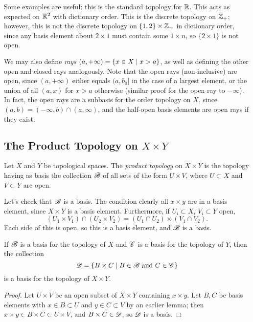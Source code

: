 \documentclass[10pt]{report}
\begin{document}
Some examples are useful: this is the standard topology for $\mathbb{R}$.
This acts as expected on $\mathbb{R}^2$ with dictionary order.
This is the discrete topology on $\mathbb{Z}_+$;
however, this is not the discrete topology on $\left\{ 1,2 \right\} \times \mathbb{Z}_+$ in dictionary order, since any basis element about $2 \times 1$ must contain some $1 \times n$, so $\{2 \times 1\}$ is not open.

We may also define \emph{rays} $(a,+\infty) = \left\{ x \in X \mid x > a \right\}$, as well as defining the other open and closed rays analogously.
Note that the open rays (non-inclusive) are open, since $(a,+\infty)$ either equals $(a,b_0]$ in the case of a largest element, or the union of all $(a,x)$ for $x > a$ otherwise (similar proof for the open ray to $-\infty$).
In fact, the open rays are a subbasis for the order topology on $X$, since $(a,b) = (-\infty,b) \cap (a,\infty)$, and the half-open basis elements are open rays if they exist.

\subsection{The Product Topology on \texorpdfstring{$X \times Y$}{XxY}}
\begin{definition}
  Let $X$ and $Y$ be topological spaces.
  The \emph{product topology} on $X \times Y$ is the topology having as basis the collection $\mathscr{B}$ of all sets of the form $U \times V$, where $U \subset X$ and $V \subset Y$ are open.
\end{definition}

Let's check that $\mathscr{B}$ is a basis.
The condition clearly all $x \times y$ are in a basis element, since $X \times Y$ is a basis element.
Furthermore, if $U_i \subset X$, $V_i \subset Y$ open, 
\[
  (U_1 \times V_1) \cap (U_2 \times V_2)
  = (U_1 \cap U_2) \times (V_1 \cap V_2).
\]
Each side of this is open, so this is a basis element, and $\mathscr{B}$ is a basis.

\begin{theorem}
  If $\mathscr{B}$ is a basis for the topology of $X$ and $\mathscr{C}$ is a basis for the topology of $Y$, then the collection
  \[
    \mathscr{D} = \left\{ B \times C \mid B \in \mathscr{B} \text{ and } C \in \mathscr{C} \right\}
  \]
  is a basis for the topology of $X \times Y$.
\end{theorem}
\begin{proof}
  Let $U \times V$ be an open subset of $X \times Y$ containing $x \times y$.
  Let $B,C$ be basis elements with $x \in B \subset U$ and $y \in C \subset V$ by an earlier lemma; then $x \times y \in B \times C \subset U \times V$, and $B \times C \in \mathscr{D}$, so $\mathscr{D}$ is a basis.
\end{proof}
\end{document}
